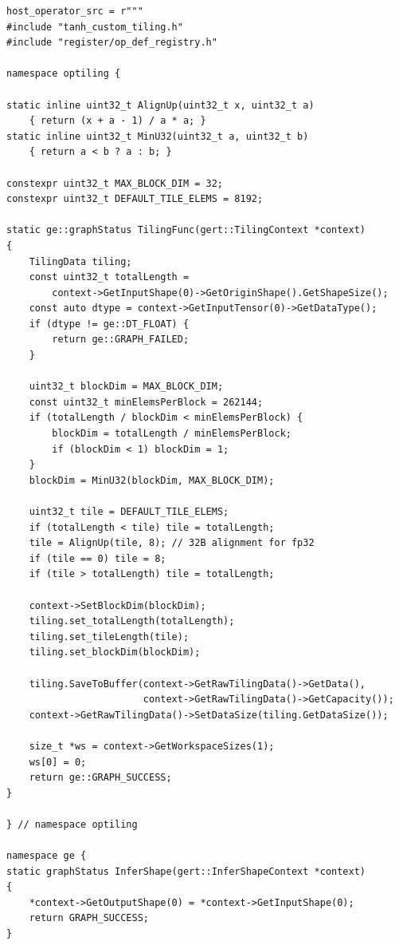 \documentclass{article} %
\theoremstyle{definition}
\theoremstyle{remark}
\begin{document}
  \begin{tcolorbox}[colback=yellow!8, colframe=yellow!40, boxrule=0.3pt, arc=0pt, left=2pt, right=2pt, top=0pt, bottom=0pt, breakable, nobeforeafter]
  \begin{verbatim}
host_operator_src = r"""
#include "tanh_custom_tiling.h"
#include "register/op_def_registry.h"

namespace optiling {

static inline uint32_t AlignUp(uint32_t x, uint32_t a) 
    { return (x + a - 1) / a * a; }
static inline uint32_t MinU32(uint32_t a, uint32_t b) 
    { return a < b ? a : b; }

constexpr uint32_t MAX_BLOCK_DIM = 32;
constexpr uint32_t DEFAULT_TILE_ELEMS = 8192;

static ge::graphStatus TilingFunc(gert::TilingContext *context)
{
    TilingData tiling;
    const uint32_t totalLength = 
        context->GetInputShape(0)->GetOriginShape().GetShapeSize();
    const auto dtype = context->GetInputTensor(0)->GetDataType();
    if (dtype != ge::DT_FLOAT) {
        return ge::GRAPH_FAILED;
    }

    uint32_t blockDim = MAX_BLOCK_DIM;
    const uint32_t minElemsPerBlock = 262144;
    if (totalLength / blockDim < minElemsPerBlock) {
        blockDim = totalLength / minElemsPerBlock;
        if (blockDim < 1) blockDim = 1;
    }
    blockDim = MinU32(blockDim, MAX_BLOCK_DIM);

    uint32_t tile = DEFAULT_TILE_ELEMS;
    if (totalLength < tile) tile = totalLength;
    tile = AlignUp(tile, 8); // 32B alignment for fp32
    if (tile == 0) tile = 8;
    if (tile > totalLength) tile = totalLength;

    context->SetBlockDim(blockDim);
    tiling.set_totalLength(totalLength);
    tiling.set_tileLength(tile);
    tiling.set_blockDim(blockDim);

    tiling.SaveToBuffer(context->GetRawTilingData()->GetData(),
                        context->GetRawTilingData()->GetCapacity());
    context->GetRawTilingData()->SetDataSize(tiling.GetDataSize());

    size_t *ws = context->GetWorkspaceSizes(1);
    ws[0] = 0;
    return ge::GRAPH_SUCCESS;
}

} // namespace optiling

namespace ge {
static graphStatus InferShape(gert::InferShapeContext *context)
{
    *context->GetOutputShape(0) = *context->GetInputShape(0);
    return GRAPH_SUCCESS;
}


\end{verbatim}
\end{tcolorbox}
\end{document}
